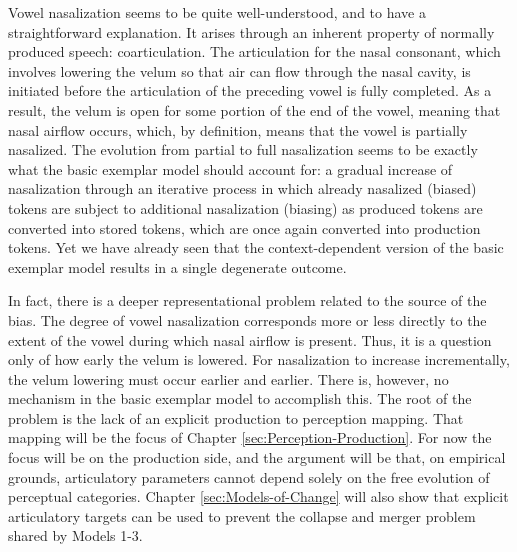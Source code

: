 Vowel nasalization seems to be quite well-understood, and to have
a straightforward explanation. It arises through an inherent property
of normally produced speech: coarticulation. The articulation for
the nasal consonant, which involves lowering the velum so that air
can flow through the nasal cavity, is initiated before the articulation
of the preceding vowel is fully completed. As a result, the velum
is open for some portion of the end of the vowel, meaning that nasal
airflow occurs, which, by definition, means that the vowel is partially
nasalized. The evolution from partial to full nasalization seems to
be exactly what the basic exemplar model should account for: a gradual
increase of nasalization through an iterative process in which already
nasalized (biased) tokens are subject to additional nasalization (biasing)
as produced tokens are converted into stored tokens, which are once
again converted into production tokens. Yet we have already seen that
the context-dependent version of the basic exemplar model results
in a single degenerate outcome. 

In fact, there is a deeper representational problem related to the
source of the bias. The degree of vowel nasalization corresponds more
or less directly to the extent of the vowel during which nasal airflow
is present. Thus, it is a question only of how early the velum is
lowered. For nasalization to increase incrementally, the velum lowering
must occur earlier and earlier. There is, however, no mechanism in
the basic exemplar model to accomplish this. The root of the problem
is the lack of an explicit production to perception mapping. That
mapping will be the focus of Chapter \ref{sec:Perception-Production}.
For now the focus will be on the production side, and the argument
will be that, on empirical grounds, articulatory parameters cannot
depend solely on the free evolution of perceptual categories. Chapter
\ref{sec:Models-of-Change} will also show that explicit articulatory
targets can be used to prevent the collapse and merger problem shared
by Models 1-3.
